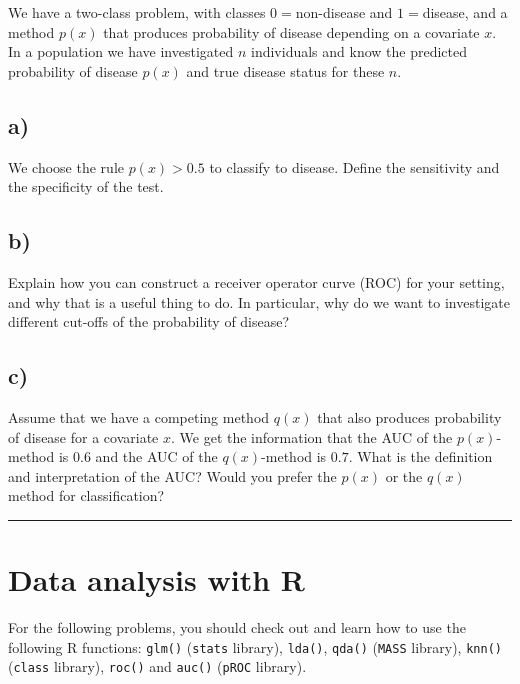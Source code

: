 \documentclass[
]{article}
\begin{document}
We have a two-class problem, with classes \(0=\)non-disease and
\(1=\)disease, and a method \(p(x)\) that produces probability of
disease depending on a covariate \(x\). In a population we have
investigated \(n\) individuals and know the predicted probability of
disease \(p(x)\) and true disease status for these \(n\).

\subsection{a)}\label{a-4}

We choose the rule \(p(x)>0.5\) to classify to disease. Define the
sensitivity and the specificity of the test.

\subsection{b)}\label{b-4}

Explain how you can construct a receiver operator curve (ROC) for your
setting, and why that is a useful thing to do. In particular, why do we
want to investigate different cut-offs of the probability of disease?

\subsection{c)}\label{c-2}

Assume that we have a competing method \(q(x)\) that also produces
probability of disease for a covariate \(x\). We get the information
that the AUC of the \(p(x)\)-method is \(0.6\) and the AUC of the
\(q(x)\)-method is \(0.7\). What is the definition and interpretation of
the AUC? Would you prefer the \(p(x)\) or the \(q(x)\) method for
classification?

\begin{center}\rule{0.5\linewidth}{0.5pt}\end{center}

\section{Data analysis with R}\label{data-analysis-with-r}

For the following problems, you should check out and learn how to use
the following R functions: \texttt{glm()} (\texttt{stats} library),
\texttt{lda()}, \texttt{qda()} (\texttt{MASS} library), \texttt{knn()}
(\texttt{class} library), \texttt{roc()} and \texttt{auc()}
(\texttt{pROC} library).
\end{document}
